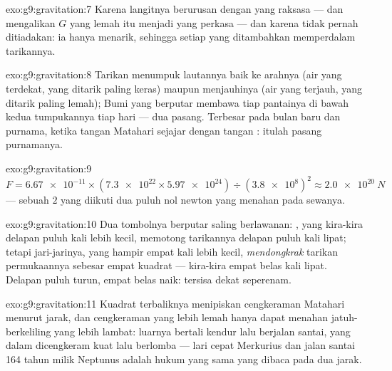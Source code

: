 \begin{solution}{exo:g9:gravitation:7}
Karena langitnya berurusan dengan  yang raksasa ---  dan
 mengalikan $G$ yang lemah itu menjadi  yang perkasa ---
dan karena  tidak pernah ditiadakan: ia hanya menarik,
sehingga setiap  yang ditambahkan memperdalam tarikannya.
\end{solution}

\begin{solution}{exo:g9:gravitation:8}
Tarikan  menumpuk lautannya baik ke arahnya (air yang terdekat,
yang ditarik paling keras) maupun menjauhinya (air yang terjauh, yang
ditarik paling lemah); Bumi yang berputar membawa tiap pantainya di
bawah kedua tumpukannya tiap hari --- dua pasang. Terbesar pada bulan
baru dan purnama, ketika tangan Matahari sejajar dengan tangan :
itulah pasang purnamanya.
\end{solution}

\begin{solution}{exo:g9:gravitation:9}
$F = \num{6.67e-11} \times (\num{7.3e22} \times
\num{5.97e24}) \div (\num{3.8e8})^2 \approx \qty{2.0e20}{N}$
--- sebuah $2$ yang diikuti dua puluh nol newton yang menahan 
pada sewanya.
\end{solution}

\begin{solution}{exo:g9:gravitation:10}
Dua tombolnya berputar saling berlawanan:  , yang kira-kira
delapan puluh kali lebih kecil, memotong tarikannya delapan puluh kali
lipat; tetapi jari-jarinya, yang hampir empat kali lebih kecil,
\emph{mendongkrak} tarikan permukaannya sebesar empat kuadrat ---
kira-kira empat belas kali lipat. Delapan puluh turun, empat belas
naik: tersisa dekat seperenam.
\end{solution}

\begin{solution}{exo:g9:gravitation:11}
Kuadrat terbaliknya menipiskan cengkeraman Matahari menurut jarak, dan
cengkeraman yang lebih lemah hanya dapat menahan jatuh-berkeliling
yang lebih lambat:  luarnya bertali kendur lalu berjalan santai,
yang dalam dicengkeram kuat lalu berlomba --- lari cepat Merkurius dan
jalan santai 164 tahun milik Neptunus adalah hukum yang sama yang
dibaca pada dua jarak.
\end{solution}

